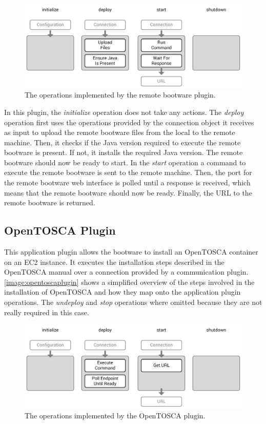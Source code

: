 \begin{figure}[!htbp]
	\centering
	\includegraphics[resolution=600]{implementation/assets/remotebootware_plugin}
	\caption{The operations implemented by the remote bootware plugin.}
	\label{image:remotebootwareplugin}
\end{figure}

In this plugin, the \textit{initialize} operation does not take any actions.
The \textit{deploy} operation first uses the operations provided by the connection object it receives as input to upload the remote bootware files from the local to the remote machine.
Then, it checks if the Java version required to execute the remote bootware is present.
If not, it installs the required Java version.
The remote bootware should now be ready to start.
In the \textit{start} operation a command to execute the remote bootware is sent to the remote machine.
Then, the port for the remote bootware web interface is polled until a response is received, which means that the remote bootware should now be ready.
Finally, the URL to the remote bootware is returned.

\subsection{OpenTOSCA Plugin}

This application plugin allows the bootware to install an OpenTOSCA container on an EC2 instance.
It executes the installation steps described in the OpenTOSCA manual over a connection provided by a communication plugin.
\autoref{image:opentoscaplugin} shows a simplified overview of the steps involved in the installation of OpenTOSCA and how they map onto the application plugin operations.
The \textit{undeploy} and \textit{stop} operations where omitted because they are not really required in this case.

\begin{figure}[!htbp]
	\centering
	\includegraphics[resolution=600]{implementation/assets/opentosca_plugin}
	\caption{The operations implemented by the OpenTOSCA plugin.}
	\label{image:opentoscaplugin}
\end{figure}

